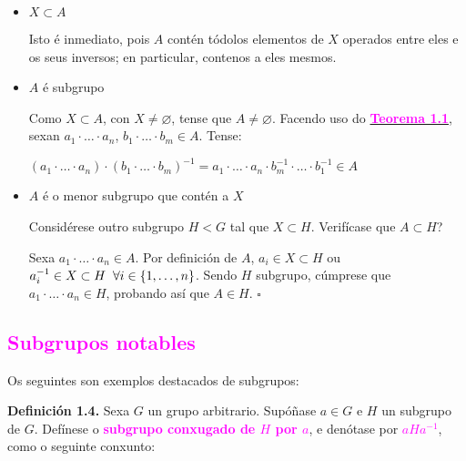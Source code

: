 \documentclass[twoside]{report}
\newcommand{\magbf}[1]{\textcolor{magenta}{\textbf{#1}}} %
\theoremstyle{mystyle}
\begin{document}
\begin{itemize}
    \item $X \subset A$
    
    Isto é inmediato, pois $A$ contén tódolos elementos de $X$ operados entre eles e os seus inversos; en particular, contenos a eles mesmos.
    
    \item $A$ é subgrupo
    
    Como $X \subset A$, con $X \neq \varnothing$, tense que $A \neq \varnothing$. Facendo uso do \hyperref[th1.1]{\magbf{Teorema 1.1}}, sexan $a_{1} \cdot \dots \cdot a_{n}$, $b_{1} \cdot \dots \cdot b_{m} \in A$. Tense:
    
    $(a_{1} \cdot \dots \cdot a_{n}) \cdot (b_{1} \cdot \dots \cdot b_{m})^{-1} = a_{1} \cdot \dots \cdot a_{n} \cdot b_{m}^{-1} \cdot \dots \cdot b_{1}^{-1} \in A$
    
    \item $A$ é o menor subgrupo que contén a $X$
    
    Considérese outro subgrupo $H < G$ tal que $X \subset H$. Verifícase que $A \subset H$?
    
    Sexa $a_{1} \cdot \dots \cdot a_{n} \in A$. Por definición de $A$, $a_{i} \in X \subset H$ ou $a_{i}^{-1} \in X \subset H \hspace{2mm} \forall i \in \{1,\dots,n\}$. Sendo $H$ subgrupo, cúmprese que $a_{1} \cdot \dots \cdot a_{n} \in H$, probando así que $A \in H$. $\square$
\end{itemize}

\vspace{-5mm}

\textcolor{magenta}{\subsection{Subgrupos notables}}

\vspace{3mm}

\noindent Os seguintes son exemplos destacados de subgrupos:

\vspace{3mm}

\noindent \textbf{Definición 1.4.} Sexa $G$ un grupo arbitrario. Supóñase $a \in G$ e $H$ un subgrupo de $G$. Defínese o \textbf{\textcolor{magenta}{subgrupo conxugado de $H$ por $a$}}, e denótase por \textcolor{magenta}{$aHa^{-1}$}, como o seguinte conxunto:

\vspace{2mm}
\end{document}
